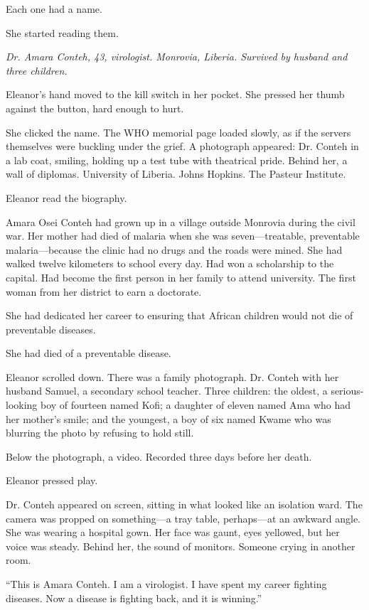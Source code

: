 Each one had a name.

She started reading them.

\emph{Dr. Amara Conteh, 43, virologist. Monrovia, Liberia. Survived by husband and three children.}

Eleanor's hand moved to the kill switch in her pocket. She pressed her thumb against the button, hard enough to hurt.

She clicked the name. The WHO memorial page loaded slowly, as if the servers themselves were buckling under the grief. A photograph appeared: Dr. Conteh in a lab coat, smiling, holding up a test tube with theatrical pride. Behind her, a wall of diplomas. University of Liberia. Johns Hopkins. The Pasteur Institute.

Eleanor read the biography.

Amara Osei Conteh had grown up in a village outside Monrovia during the civil war. Her mother had died of malaria when she was seven---treatable, preventable malaria---because the clinic had no drugs and the roads were mined. She had walked twelve kilometers to school every day. Had won a scholarship to the capital. Had become the first person in her family to attend university. The first woman from her district to earn a doctorate.

She had dedicated her career to ensuring that African children would not die of preventable diseases.

She had died of a preventable disease.

Eleanor scrolled down. There was a family photograph. Dr. Conteh with her husband Samuel, a secondary school teacher. Three children: the oldest, a serious-looking boy of fourteen named Kofi; a daughter of eleven named Ama who had her mother's smile; and the youngest, a boy of six named Kwame who was blurring the photo by refusing to hold still.

Below the photograph, a video. Recorded three days before her death.

Eleanor pressed play.

Dr. Conteh appeared on screen, sitting in what looked like an isolation ward. The camera was propped on something---a tray table, perhaps---at an awkward angle. She was wearing a hospital gown. Her face was gaunt, eyes yellowed, but her voice was steady. Behind her, the sound of monitors. Someone crying in another room.

``This is Amara Conteh. I am a virologist. I have spent my career fighting diseases. Now a disease is fighting back, and it is winning.''

